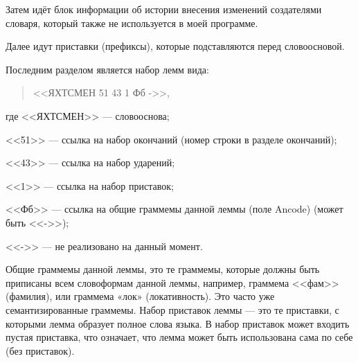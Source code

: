 \documentclass[12pt,a4paper,onecolumn]{report}
\begin{document}
Затем идёт блок информации об истории внесения изменений создателями словаря, который также не используется в моей программе.

Далее идут приставки (префиксы), которые подставляются перед словоосновой.

Последним разделом является набор лемм вида:
\begin{quotation}
<<ЯХТСМЕН 51 43 1 Фб ->>,
\end{quotation}

где <<ЯХТСМЕН>> --- словооснова;

<<51>> --- ссылка на набор окончаний (номер строки в разделе окончаний);

<<43>> --- ссылка на набор ударений;

<<1>> --- ссылка на набор приставок;

<<Фб>> --- ссылка на общие граммемы данной леммы (поле Ancode) (может быть <<->>);

<<->> --- не реализовано на данный момент.

Общие граммемы данной леммы, это те граммемы, которые должны быть приписаны всем словоформам данной леммы, например, граммема <<фам>> (фамилия), или граммема «лок» (локативность). Это часто уже семантизированные граммемы.
Набор приставок леммы --- это те приставки, с которыми лемма образует полное слова языка. В набор приставок может входить пустая приставка, что означает, что лемма может быть использована сама по себе (без приставок).
\end{document}
